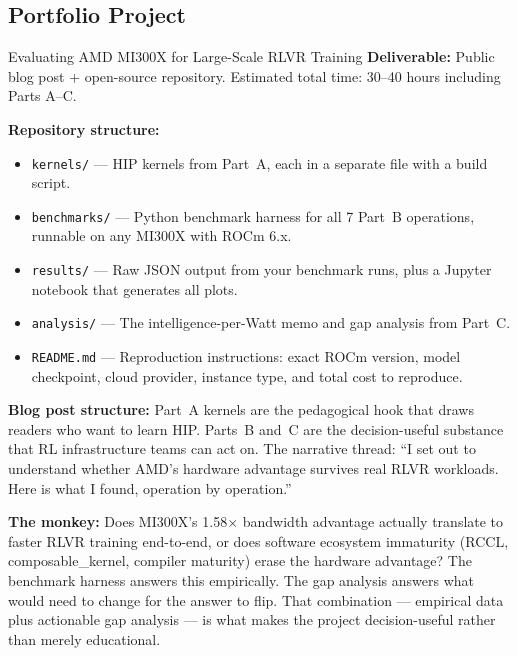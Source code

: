 \subsection{Portfolio Project}

\begin{portfolio}{Evaluating AMD MI300X for Large-Scale RLVR Training}
\textbf{Deliverable:} Public blog post + open-source repository. Estimated total time: 30--40 hours including Parts A--C.

\textbf{Repository structure:}
\begin{itemize}
  \item \texttt{kernels/} --- HIP kernels from Part~A, each in a separate file with a build script.
  \item \texttt{benchmarks/} --- Python benchmark harness for all 7 Part~B operations, runnable on any MI300X with ROCm 6.x.
  \item \texttt{results/} --- Raw JSON output from your benchmark runs, plus a Jupyter notebook that generates all plots.
  \item \texttt{analysis/} --- The intelligence-per-Watt memo and gap analysis from Part~C.
  \item \texttt{README.md} --- Reproduction instructions: exact ROCm version, model checkpoint, cloud provider, instance type, and total cost to reproduce.
\end{itemize}

\textbf{Blog post structure:} Part~A kernels are the pedagogical hook that draws readers who want to learn HIP. Parts~B and~C are the decision-useful substance that RL infrastructure teams can act on. The narrative thread: ``I set out to understand whether AMD's hardware advantage survives real RLVR workloads. Here is what I found, operation by operation.''

\textbf{The monkey:} Does MI300X's 1.58$\times$ bandwidth advantage actually translate to faster RLVR training end-to-end, or does software ecosystem immaturity (RCCL, composable\_kernel, compiler maturity) erase the hardware advantage? The benchmark harness answers this empirically. The gap analysis answers what would need to change for the answer to flip. That combination --- empirical data plus actionable gap analysis --- is what makes the project decision-useful rather than merely educational.


\end{portfolio}
